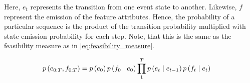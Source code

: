 \documentclass[./../../paper.tex]{subfiles}
\begin{document}

% 




\noindent Here, $e_t$ represents the transition from one event state to another. Likewise, $f$ represent the emission of the feature attributes.  Hence, the probability of a particular sequence is the product of the transition probability multiplied with state emission probability for each step. Note, that this is the same as the feasibility measure as in \autoref{eq:feasibility_measure}. 

\begin{align}
    p\left(e_{0:T},f_{0:T}\right) & = p\left(e_0\right)p\left(f_0 \mid e_0\right)\prod_1^T p\left(e_t \mid e_{t-1}\right) p\left(f_t \mid e_t\right)
    \label{eq:feasibility_measure}
\end{align}







\end{document}
